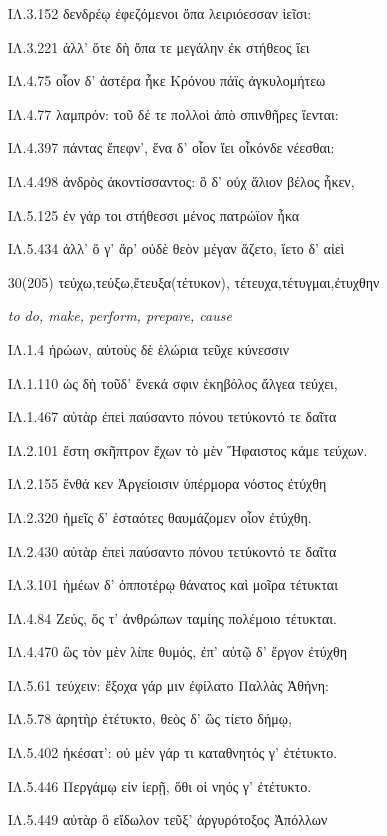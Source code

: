 \begin{enumerate}
{ΙΛ.3.152 δενδρέῳ ἐφεζόμενοι ὄπα λειριόεσσαν ἱεῖσι:

ΙΛ.3.221 ἀλλ' ὅτε δὴ ὄπα τε μεγάλην ἐκ στήθεος ἵει

ΙΛ.4.75 οἷον δ' ἀστέρα ἧκε Κρόνου πάϊς ἀγκυλομήτεω

ΙΛ.4.77 λαμπρόν: τοῦ δέ τε πολλοὶ ἀπὸ σπινθῆρες ἵενται:

ΙΛ.4.397 πάντας ἔπεφν', ἕνα δ' οἶον ἵει οἶκόνδε νέεσθαι:

ΙΛ.4.498 ἀνδρὸς ἀκοντίσσαντος: ὃ δ' οὐχ ἅλιον βέλος ἧκεν,

ΙΛ.5.125 ἐν γάρ τοι στήθεσσι μένος πατρώϊον ἧκα

ΙΛ.5.434 ἀλλ' ὅ γ' ἄρ' οὐδὲ θεὸν μέγαν ἅζετο, ἵετο δ' αἰεὶ

}



\clearpage
\item[\large 30(205)]{\large \g  τεύχω,τεύξω,ἔτευξα(τέτυκον), τέτευχα,τέτυγμαι,ἐτυχθην    }

\hspace{0.2cm} \textit{  to do, make, perform, prepare, cause }

{\g
ΙΛ.1.4 ἡρώων, αὐτοὺς δὲ ἑλώρια τεῦχε κύνεσσιν

ΙΛ.1.110 ὡς δὴ τοῦδ' ἕνεκά σφιν ἑκηβόλος ἄλγεα τεύχει,

ΙΛ.1.467 αὐτὰρ ἐπεὶ παύσαντο πόνου τετύκοντό τε δαῖτα

ΙΛ.2.101 ἔστη σκῆπτρον ἔχων τὸ μὲν Ἥφαιστος κάμε τεύχων.

ΙΛ.2.155 ἔνθά κεν Ἀργείοισιν ὑπέρμορα νόστος ἐτύχθη

ΙΛ.2.320 ἡμεῖς δ' ἑσταότες θαυμάζομεν οἷον ἐτύχθη.

ΙΛ.2.430 αὐτὰρ ἐπεὶ παύσαντο πόνου τετύκοντό τε δαῖτα

ΙΛ.3.101 ἡμέων δ' ὁπποτέρῳ θάνατος καὶ μοῖρα τέτυκται

ΙΛ.4.84 Ζεύς, ὅς τ' ἀνθρώπων ταμίης πολέμοιο τέτυκται.

ΙΛ.4.470 ὣς τὸν μὲν λίπε θυμός, ἐπ' αὐτῷ δ' ἔργον ἐτύχθη

ΙΛ.5.61 τεύχειν: ἔξοχα γάρ μιν ἐφίλατο Παλλὰς Ἀθήνη:

ΙΛ.5.78 ἀρητὴρ ἐτέτυκτο, θεὸς δ' ὣς τίετο δήμῳ,

ΙΛ.5.402 ἠκέσατ': οὐ μὲν γάρ τι καταθνητός γ' ἐτέτυκτο.

ΙΛ.5.446 Περγάμῳ εἰν ἱερῇ, ὅθι οἱ νηός γ' ἐτέτυκτο.

ΙΛ.5.449 αὐτὰρ ὃ εἴδωλον τεῦξ' ἀργυρότοξος Ἀπόλλων

}
\end{enumerate}
